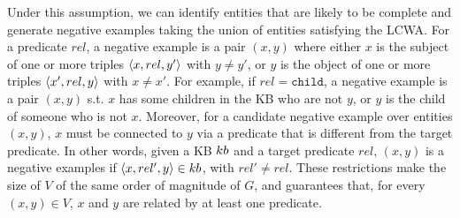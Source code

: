 Under this assumption, we can identify entities that are likely to be complete and generate negative examples taking the union of entities satisfying the LCWA. For a predicate $rel$, a negative example is a pair $(x,y)$ where either $x$ is the subject of one or more triples $\langle x,rel,y'\rangle$ with $y \neq y'$, or $y$ is the object of one or more triples $\langle x',rel,y\rangle$ with $x \neq x'$. 
For example, if $rel=\texttt{child}$, a negative example is a pair $(x,y)$ s.t. $x$ has some children in the KB who are not $y$, or $y$ is the child of someone who is not $x$. %
Moreover, for a candidate negative example over entities $(x,y)$, $x$ must be connected to $y$ via a predicate that is different from the target predicate. In other words, given a KB ${\sc kb}$ and a target predicate $rel$, $(x,y)$ is a negative examples if $\langle x,rel',y\rangle \in {\sc kb}$, with $rel' \neq rel$. 
These restrictions make the size of $V$ of the same order of magnitude of $G$, %
and guarantees that, for every $(x,y) \in V$, $x$ and $y$ are related by at least one predicate.



